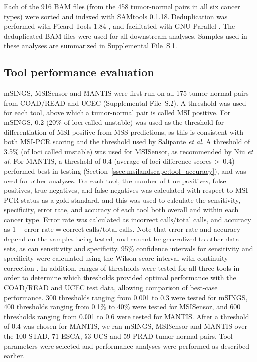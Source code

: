 Each of the 916 BAM files (from the 458 tumor-normal pairs in all six cancer types) were sorted and indexed with SAMtools 0.1.18. Deduplication was performed with Picard Tools 1.84 \cite{Picard2019toolkit}, and facilitated with GNU Parallel \cite{tange2011}. The deduplicated BAM files were used for all downstream analyses. Samples used in these analyses are summarized in Supplemental File~S\thechapter{}.1.

\subsection{Tool performance evaluation}
mSINGS, MSISensor and MANTIS were first run on all 175 tumor-normal pairs from COAD/READ and UCEC (Supplemental File~S\thechapter{}.2). A threshold was used for each tool, above which a tumor-normal pair is called MSI positive. For mSINGS, 0.2 (20\% of loci called unstable) was used as the threshold for differentiation of MSI positive from MSS predictions, as this is consistent with both MSI-PCR scoring and the threshold used by Salipante \textit{et al}. A threshold of 3.5\% (of loci called unstable) was used for MSISensor, as recommended by Niu \textit{et al}. For MANTIS, a threshold of 0.4 (average of loci difference scores \textgreater{}~0.4) performed best in testing (Section~\ref{ssec:msilandscape:tool_accuracy}), and was used for other analyses. For each tool, the number of true positives, false positives, true negatives, and false negatives was calculated with respect to MSI-PCR status as a gold standard, and this was used to calculate the sensitivity, specificity, error rate, and accuracy of each tool both overall and within each cancer type. Error rate was calculated as $\text{incorrect calls} / \text{total calls}$, and accuracy as $1-\text{error rate}=\text{correct calls} / \text{total calls}$. Note that error rate and accuracy depend on the samples being tested, and cannot be generalized to other data sets, as can sensitivity and specificity. 95\% confidence intervals for sensitivity and specificity were calculated using the Wilson score interval with continuity correction \cite{newcombe1998}. In addition, ranges of thresholds were tested for all three tools in order to determine which thresholds provided optimal performance with the COAD/READ and UCEC test data, allowing comparison of best-case performance. 300 thresholds ranging from 0.001 to 0.3 were tested for mSINGS, 400 thresholds ranging from 0.1\% to 40\% were tested for MSISensor, and 600 thresholds ranging from 0.001 to 0.6 were tested for MANTIS\@. After a threshold of 0.4 was chosen for MANTIS, we ran mSINGS, MSISensor and MANTIS over the 100 STAD, 71 ESCA, 53 UCS and 59 PRAD tumor-normal pairs. Tool parameters were selected and performance analyses were performed as described earlier.

